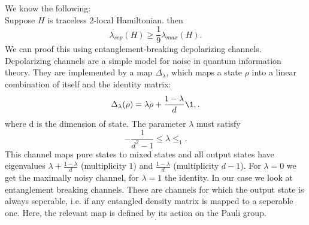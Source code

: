 We know the following: \\
Suppose $H$ is traceless 2-local Hamiltonian. then \[
	\lambda_{sep}(H)\ge \frac{1}{9}\lambda_{max}(H)
.\]
We can proof this using entanglement-breaking depolarizing channels.
Depolarizing channels are a simple model for noise in quantum information theory. \cite{nielsen11}
They are implemented by a map $\Delta_{\lambda}$, which maps a state  $\rho$ into a linear combination of itself and the identity matrix:\cite{king02}\[
	\Delta_{\lambda}(\rho)=\lambda\rho+\frac{1-\lambda}{d}\1,
.\]
where d is the dimension of state. The parameter $\lambda$ must satisfy \[
	-\frac{1}{d^2-1}\le\lambda\le_1
.\]
This channel maps pure states to mixed states and all output states have eigenvalues $\lambda+\frac{1-\lambda}{d}$ (multiplicity $1$) and $\frac{1-\lambda}{d}$ (multiplicity $d-1$).
For $\lambda=0$ we get the maximally noisy channel, for $\lambda=1$ the identity.
In our case we look at entanglement breaking channels.
These are channels for which the output state is always seperable, i.e. if any entangled density matrix is mapped to a seperable one.\cite{horodecki08}
Here, the relevant map is defined by its action on the Pauli group.\[

.\]
